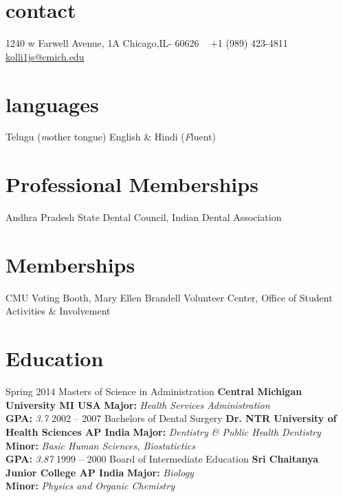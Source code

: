 \documentclass[]{friggeri-cv} %
\begin{document}


\begin{aside} %
\section{contact}
1240 w Farwell Avenue, 1A
Chicago,IL- 60626
~
+1 (989) 423-4811
~
\href{mailto:kolli1js@cmich.edu}{kolli1js@cmich.edu}
\section{languages}
Telugu ({\emph mother tongue})
English \& Hindi ({\emph Fluent})
\section{Professional Memberships}
Andhra Pradesh State Dental Council, Indian Dental Association
\section{Memberships}
CMU Voting Booth, Mary Ellen Brandell Volunteer Center, Office of Student Activities \& Involvement
\end{aside}


\section{Education}

\begin{entrylist}
\entry
{Spring 2014}
{Masters of Science {\normalfont in Administration}}
{\bf Central Michigan University MI USA}
{{\bf Major:} \emph{Health Services Administration}\\ {\bf GPA:} \emph{3.7}}
\entry
{2002 -- 2007}
{Bachelors {\normalfont of Dental Surgery}}
{\bf Dr. NTR University of Health Sciences AP India}
{{\bf Major:} \emph{Dentistry \& Public Health Dentistry} \\ {\bf Minor:} \emph{Basic Human Sciences, Biostatictics} \\ {\bf GPA:} \emph{3.87}}
\entry
{1999 -- 2000}
{Board {\normalfont of Intermediate Education}}
{\bf Sri Chaitanya Junior College AP India}
{{\bf Major:} \emph{Biology} \\ {\bf Minor:} \emph{Physics and Organic Chemistry}}
\end{entrylist}
\end{document}
